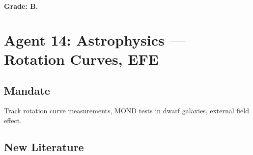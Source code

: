 \documentclass[11pt,a4paper]{article}
\begin{document}
\textbf{Grade: B.}

\section{Agent 14: Astrophysics --- Rotation Curves, EFE}

\subsection{Mandate}
Track rotation curve measurements, MOND tests in dwarf galaxies, external field effect.

\subsection{New Literature}
\end{document}
